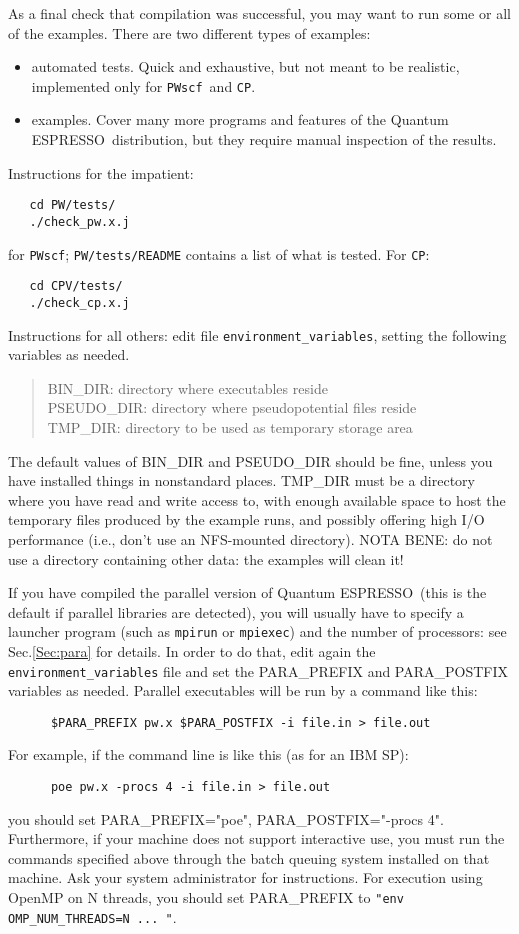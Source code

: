 \documentclass[12pt,a4paper]{article}
\def\qe{{\sc Quantum ESPRESSO}}
\def\PWscf{\texttt{PWscf}}
\def\CP{\texttt{CP}}
\begin{document}
As a final check that compilation was successful, you may want to run some or
all of the examples. There are two different types of examples:
\begin{itemize}
\item automated tests. Quick and exhaustive, but not
meant to be realistic, implemented only for \PWscf\ and \CP.
\item examples.
Cover many more programs and features of the \qe\ distribution,
but they require manual inspection of the results.
\end{itemize}
Instructions for the impatient:
\begin{verbatim}
   cd PW/tests/
   ./check_pw.x.j
\end{verbatim}
for \PWscf;
\texttt{PW/tests/README} contains a list of what is tested.
For \CP:
\begin{verbatim}
   cd CPV/tests/
   ./check_cp.x.j
\end{verbatim}
Instructions for all others: edit file \texttt{environment\_variables},
setting the following variables as needed.
\begin{quote}
   BIN\_DIR: directory where executables reside\\
   PSEUDO\_DIR: directory where pseudopotential files reside\\
   TMP\_DIR: directory to be used as temporary storage area
\end{quote}
The default values of BIN\_DIR and PSEUDO\_DIR should be fine,
unless you have installed things in nonstandard places. TMP\_DIR
must be a directory where you have read and write access to, with
enough available space to host the temporary files produced by the
example runs, and possibly offering high I/O performance (i.e., don't
use an NFS-mounted directory). NOTA BENE: do not use a
directory containing other data: the examples will clean it!

If you have compiled the parallel version of \qe\ (this
is the default if parallel libraries are detected), you will usually
have to specify a launcher program (such as \texttt{mpirun} or
\texttt{mpiexec}) and the number of processors: see Sec.\ref{Sec:para} for
details. In order to do that, edit again the \texttt{environment\_variables}
file
and set the PARA\_PREFIX and PARA\_POSTFIX variables as needed.
Parallel executables will be run by a command like this:
\begin{verbatim}
      $PARA_PREFIX pw.x $PARA_POSTFIX -i file.in > file.out
\end{verbatim}
For example, if the command line is like this (as for an IBM SP):
\begin{verbatim}
      poe pw.x -procs 4 -i file.in > file.out
\end{verbatim}
you should set PARA\_PREFIX="poe", PARA\_POSTFIX="-procs
4". Furthermore, if your machine does not support interactive use, you
must run the commands specified above through the batch queuing
system installed on that machine. Ask your system administrator for
instructions. For execution using OpenMP on N threads,
you should set PARA\_PREFIX to \texttt{"env OMP\_NUM\_THREADS=N ... "}.
\end{document}
